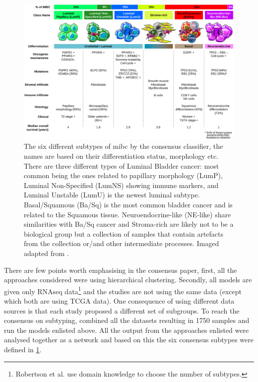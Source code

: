 \begin{figure}[!htb]                                  
    \centering\includegraphics[width=1.0\textwidth,height=1.0\textheight,keepaspectratio]{Images/TCGA/2020_consensus_subtypes.jpg}
      \caption{The six different subtypes of \acrfull{mibc} by the consensus classifier\cite{Kamoun2020-tj}, the names are based on their differentiation status, morphology etc. There are three different types of Luminal Bladder cancer: most common being the ones related to papillary morphology (LumP), Luminal Non-Specified (LumNS) showing immune markers, and Luminal Unstable (LumU) is the newest luminal subtype. Basal/Squamous (Ba/Sq) is the most common bladder cancer and is related to the Squamous tissue. Neuroendocrine-like (NE-like) share similarities with Ba/Sq cancer and Stroma-rich are likely not to be a biological group but a collection of samples that contain artefacts from the collection or/and other intermediate processes. Imaged adapted from \cite{Kamoun2020-tj}.
      }
      \label{fig:2020_consens}
  \end{figure}
  \FloatBarrier

There are few points worth emphasising in the consensus paper, first, all the approaches\cite{Mo2018-rl, Damrauer2014-tc, Choi2014-ed, Marzouka2018-ge, Rebouissou2014-ep,Robertson2017-mg} considered were using hierarchical clustering. Secondly, all models are given only RNAseq data\footnote{Robertson et al. use domain knowledge to choose the number of subtypes.} and the studies are not using the same data (except \cite{Robertson2017-mg, Mo2018-rl} which both are using TCGA data). One consequence of using different data sources is that each study proposed a different set of subgroups. To reach the consensus on subtyping, \citet{Kamoun2020-tj} combined all the datasets resulting in 1750 samples and run the models enlisted above. All the output from the approaches enlisted were analysed together as a network and based on this the six consensus subtypes were defined in \cref{fig:2020_consens}.

